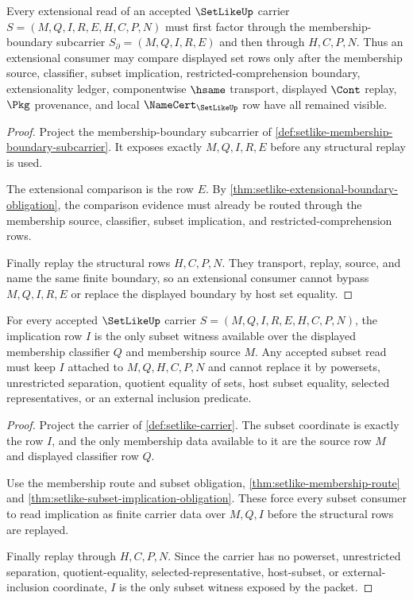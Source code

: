\begin{theorem}
\label{thm:setlike-extensional-boundary-route}
Every extensional read of an accepted $\SetLikeUp$ carrier $S=(M,Q,I,R,E,H,C,P,N)$ must first factor through the membership-boundary subcarrier $S_{\partial}=(M,Q,I,R,E)$ and then through $H,C,P,N$. Thus an extensional consumer may compare displayed set rows only after the membership source, classifier, subset implication, restricted-comprehension boundary, extensionality ledger, componentwise $\hsame$ transport, displayed $\Cont$ replay, $\Pkg$ provenance, and local $\NameCert_{\SetLikeUp}$ row have all remained visible.
\end{theorem}
\begin{proof}
Project the membership-boundary subcarrier of \autoref{def:setlike-membership-boundary-subcarrier}. It exposes exactly $M,Q,I,R,E$ before any structural replay is used.

The extensional comparison is the row $E$. By \autoref{thm:setlike-extensional-boundary-obligation}, the comparison evidence must already be routed through the membership source, classifier, subset implication, and restricted-comprehension rows.

Finally replay the structural rows $H,C,P,N$. They transport, replay, source, and name the same finite boundary, so an extensional consumer cannot bypass $M,Q,I,R,E$ or replace the displayed boundary by host set equality.
\end{proof}

\begin{theorem}
\label{thm:setlike-subset-implication-witness}
For every accepted $\SetLikeUp$ carrier $S=(M,Q,I,R,E,H,C,P,N)$, the implication row $I$ is the only subset witness available over the displayed membership classifier $Q$ and membership source $M$. Any accepted subset read must keep $I$ attached to $M,Q,H,C,P,N$ and cannot replace it by powersets, unrestricted separation, quotient equality of sets, host subset equality, selected representatives, or an external inclusion predicate.
\end{theorem}
\begin{proof}
Project the carrier of \autoref{def:setlike-carrier}. The subset coordinate is exactly the row $I$, and the only membership data available to it are the source row $M$ and displayed classifier row $Q$.

Use the membership route and subset obligation, \autoref{thm:setlike-membership-route} and \autoref{thm:setlike-subset-implication-obligation}. These force every subset consumer to read implication as finite carrier data over $M,Q,I$ before the structural rows are replayed.

Finally replay through $H,C,P,N$. Since the carrier has no powerset, unrestricted separation, quotient-equality, selected-representative, host-subset, or external-inclusion coordinate, $I$ is the only subset witness exposed by the packet.
\end{proof}

